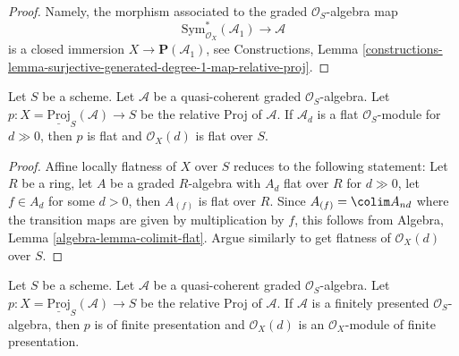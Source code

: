 \begin{proof}
Namely, the morphism associated to the graded $\mathcal{O}_S$-algebra map
$$
\text{Sym}_{\mathcal{O}_X}^*(\mathcal{A}_1)
\longrightarrow
\mathcal{A}
$$
is a closed immersion $X \to \mathbf{P}(\mathcal{A}_1)$, see
Constructions, Lemma
\ref{constructions-lemma-surjective-generated-degree-1-map-relative-proj}.
\end{proof}

\begin{lemma}
\label{lemma-relative-proj-flat}
Let $S$ be a scheme. Let $\mathcal{A}$ be a quasi-coherent graded
$\mathcal{O}_S$-algebra. Let
$p : X = \underline{\text{Proj}}_S(\mathcal{A}) \to S$ be the relative
Proj of $\mathcal{A}$. If $\mathcal{A}_d$ is a flat $\mathcal{O}_S$-module
for $d \gg 0$, then $p$ is flat and $\mathcal{O}_X(d)$ is
flat over $S$.
\end{lemma}

\begin{proof}
Affine locally flatness of $X$ over $S$ reduces to the following statement:
Let $R$ be a ring, let $A$ be a graded $R$-algebra with
$A_d$ flat over $R$ for $d \gg 0$, let $f \in A_d$
for some $d > 0$, then $A_{(f)}$ is flat over $R$.
Since $A_{(f)} = \colim A_{nd}$ where the transition maps
are given by multiplication by $f$, this follows from
Algebra, Lemma \ref{algebra-lemma-colimit-flat}.
Argue similarly to get flatness of $\mathcal{O}_X(d)$ over $S$.
\end{proof}

\begin{lemma}
\label{lemma-relative-proj-finite-presentation}
Let $S$ be a scheme. Let $\mathcal{A}$ be a quasi-coherent graded
$\mathcal{O}_S$-algebra. Let
$p : X = \underline{\text{Proj}}_S(\mathcal{A}) \to S$ be the relative
Proj of $\mathcal{A}$. If $\mathcal{A}$ is a finitely presented
$\mathcal{O}_S$-algebra, then $p$ is of finite presentation
and $\mathcal{O}_X(d)$ is an $\mathcal{O}_X$-module of finite presentation.
\end{lemma}

